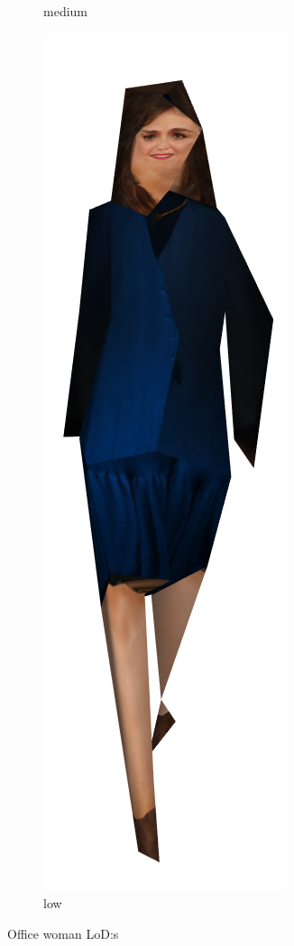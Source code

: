 \begin{figure}[h]
\begin{subfigure}[b]{.22\textwidth}
    \caption{medium}
    \label{fig:womaneq2}
  \end{subfigure}%
  \begin{subfigure}[b]{.22\textwidth}
    \includegraphics[width=\textwidth]{figures/woman/equal_distance/3.png}
    \caption{low}
    \label{fig:womaneq3}
  \end{subfigure}
  \caption{Office woman LoD:s}
  \label{fig:woman_lodeq}
\end{figure}
